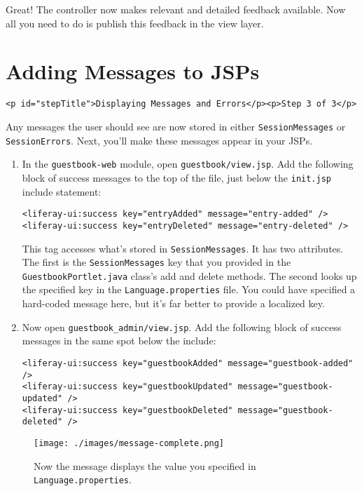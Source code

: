 Great! The controller now makes relevant and detailed feedback
available. Now all you need to do is publish this feedback in the view
layer.

\chapter{Adding Messages to JSPs}\label{adding-messages-to-jsps}

\begin{verbatim}
<p id="stepTitle">Displaying Messages and Errors</p><p>Step 3 of 3</p>
\end{verbatim}

Any messages the user should see are now stored in either
\texttt{SessionMessages} or \texttt{SessionErrors}. Next, you'll make
these messages appear in your JSPs.

\begin{enumerate}
\def\labelenumi{\arabic{enumi}.}
\item
  In the \texttt{guestbook-web} module, open
  \texttt{guestbook/view.jsp}. Add the following block of success
  messages to the top of the file, just below the \texttt{init.jsp}
  include statement:

\begin{verbatim}
<liferay-ui:success key="entryAdded" message="entry-added" />
<liferay-ui:success key="entryDeleted" message="entry-deleted" />
\end{verbatim}

  This tag accesses what's stored in \texttt{SessionMessages}. It has
  two attributes. The first is the \texttt{SessionMessages} key that you
  provided in the \texttt{GuestbookPortlet.java} class's add and delete
  methods. The second looks up the specified key in the
  \texttt{Language.properties} file. You could have specified a
  hard-coded message here, but it's far better to provide a localized
  key.
\item
  Now open \texttt{guestbook\_admin/view.jsp}. Add the following block
  of success messages in the same spot below the include:

\begin{verbatim}
<liferay-ui:success key="guestbookAdded" message="guestbook-added" />
<liferay-ui:success key="guestbookUpdated" message="guestbook-updated" />
<liferay-ui:success key="guestbookDeleted" message="guestbook-deleted" />
\end{verbatim}
\end{enumerate}

\begin{figure}
\centering
\texttt{[image: ./images/message-complete.png]}
\caption{Now the message displays the value you specified in
\texttt{Language.properties}.}
\end{figure}

